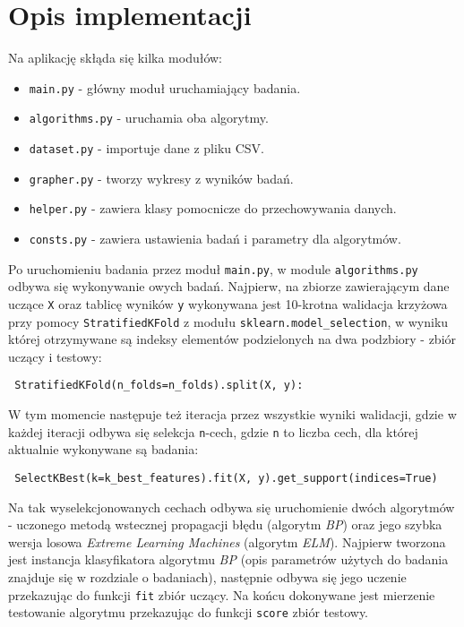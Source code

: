 \newpage

\section{Opis implementacji}

Na aplikację skłąda się kilka modułów:

\begin{itemize}
    \item \texttt{main.py} - główny moduł uruchamiający badania.
    \item \texttt{algorithms.py} - uruchamia oba algorytmy.
    \item \texttt{dataset.py} - importuje dane z pliku CSV.
    \item \texttt{grapher.py} - tworzy wykresy z wyników badań.
    \item \texttt{helper.py} - zawiera klasy pomocnicze do przechowywania danych.
    \item \texttt{consts.py} - zawiera ustawienia badań i parametry dla algorytmów.
\end{itemize}

Po uruchomieniu badania przez moduł \texttt{main.py}, w module \texttt{algorithms.py} odbywa się wykonywanie owych badań. Najpierw, na zbiorze zawierającym dane uczące \texttt{X} oraz tablicę wyników \texttt{y} wykonywana jest 10-krotna walidacja krzyżowa przy pomocy \texttt{StratifiedKFold} z modułu \texttt{sklearn.model\_selection}, w wyniku której otrzymywane są indeksy elementów podzielonych na dwa podzbiory - zbiór uczący i testowy:

\begin{verbatim}
 StratifiedKFold(n_folds=n_folds).split(X, y):
\end{verbatim}

W tym momencie następuje też iteracja przez wszystkie wyniki walidacji, gdzie w każdej iteracji odbywa się selekcja \texttt{n}-cech, gdzie \texttt{n} to liczba cech, dla której aktualnie wykonywane są badania:

\begin{verbatim}
 SelectKBest(k=k_best_features).fit(X, y).get_support(indices=True)
\end{verbatim}

Na tak wyselekcjonowanych cechach odbywa się uruchomienie dwóch algorytmów - uczonego metodą wstecznej propagacji błędu (algorytm \textit{BP}) oraz jego szybka wersja losowa \textit{Extreme Learning Machines} (algorytm \textit{ELM}). Najpierw tworzona jest instancja klasyfikatora algorytmu \textit{BP} (opis parametrów użytych do badania znajduje się w rozdziale o badaniach), następnie odbywa się jego uczenie przekazując do funkcji \texttt{fit} zbiór uczący. Na końcu dokonywane jest mierzenie testowanie algorytmu przekazując do funkcji \texttt{score} zbiór testowy.

